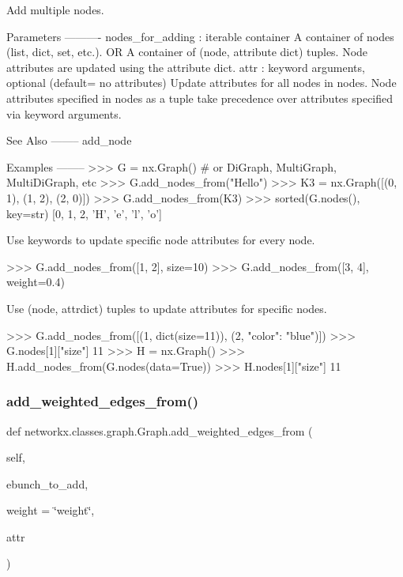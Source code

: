 \begin{DoxyVerb}Add multiple nodes.

Parameters
----------
nodes_for_adding : iterable container
    A container of nodes (list, dict, set, etc.).
    OR
    A container of (node, attribute dict) tuples.
    Node attributes are updated using the attribute dict.
attr : keyword arguments, optional (default= no attributes)
    Update attributes for all nodes in nodes.
    Node attributes specified in nodes as a tuple take
    precedence over attributes specified via keyword arguments.

See Also
--------
add_node

Examples
--------
>>> G = nx.Graph()  # or DiGraph, MultiGraph, MultiDiGraph, etc
>>> G.add_nodes_from("Hello")
>>> K3 = nx.Graph([(0, 1), (1, 2), (2, 0)])
>>> G.add_nodes_from(K3)
>>> sorted(G.nodes(), key=str)
[0, 1, 2, 'H', 'e', 'l', 'o']

Use keywords to update specific node attributes for every node.

>>> G.add_nodes_from([1, 2], size=10)
>>> G.add_nodes_from([3, 4], weight=0.4)

Use (node, attrdict) tuples to update attributes for specific nodes.

>>> G.add_nodes_from([(1, dict(size=11)), (2, {"color": "blue"})])
>>> G.nodes[1]["size"]
11
>>> H = nx.Graph()
>>> H.add_nodes_from(G.nodes(data=True))
>>> H.nodes[1]["size"]
11\end{DoxyVerb}
 \mbox{\label{classnetworkx_1_1classes_1_1graph_1_1Graph_abd79a871a021330ff7f1e47e408fa617}} 
\subsubsection{\texorpdfstring{add\+\_\+weighted\+\_\+edges\+\_\+from()}{add\_weighted\_edges\_from()}}
{\footnotesize\ttfamily def networkx.\+classes.\+graph.\+Graph.\+add\+\_\+weighted\+\_\+edges\+\_\+from (\begin{DoxyParamCaption}\item[{}]{self,  }\item[{}]{ebunch\+\_\+to\+\_\+add,  }\item[{}]{weight = {\ttfamily \char`\"{}weight\char`\"{}},  }\item[{}]{attr }\end{DoxyParamCaption})}

